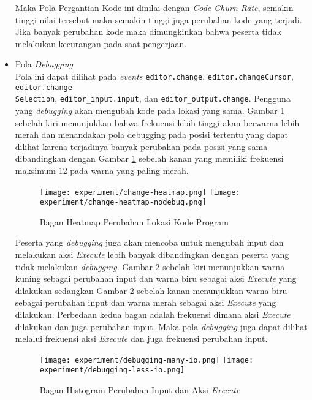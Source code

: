 \begin{itemize}
    Maka Pola Pergantian Kode ini dinilai dengan \textit{Code Churn Rate}, semakin tinggi nilai tersebut maka semakin tinggi juga perubahan kode yang terjadi. Jika banyak perubahan kode maka dimungkinkan bahwa peserta tidak melakukan kecurangan pada saat pengerjaan.

    \item Pola \textit{Debugging} \\
    Pola ini dapat dilihat pada \textit{events} \verb|editor.change|, \verb|editor.changeCursor|, \verb|editor.change|\\\verb|Selection|, \verb|editor_input.input|, dan \verb|editor_output.change|. Pengguna yang \textit{debugging} akan mengubah kode pada lokasi yang sama. Gambar \ref{fig:5:2:3:heatmapchange} sebelah kiri menunjukkan bahwa frekuensi lebih tinggi akan berwarna lebih merah dan menandakan pola debugging pada posisi tertentu yang dapat dilihat karena terjadinya banyak perubahan pada posisi yang sama dibandingkan dengan Gambar \ref{fig:5:2:3:heatmapchange} sebelah kanan yang memiliki frekuensi maksimum 12 pada warna yang paling merah.

    \begin{figure}[H]
        \centering
        \texttt{[image: experiment/change-heatmap.png]}
        \texttt{[image: experiment/change-heatmap-nodebug.png]}
        \caption{Bagan Heatmap Perubahan Lokasi Kode Program}
        \label{fig:5:2:3:heatmapchange}
    \end{figure}
    
    Peserta yang \textit{debugging} juga akan mencoba untuk mengubah input dan melakukan aksi \textit{Execute} lebih banyak dibandingkan dengan peserta yang tidak melakukan \textit{debugging}. Gambar \ref{fig:5:2:3:debug} sebelah kiri menunjukkan warna kuning sebagai perubahan input dan warna biru sebagai aksi \textit{Execute} yang dilakukan sedangkan Gambar \ref{fig:5:2:3:debug} sebelah kanan menunjukkan warna biru sebagai perubahan input dan warna merah sebagai aksi \textit{Execute} yang dilakukan. Perbedaan kedua bagan adalah frekuensi dimana aksi \textit{Execute} dilakukan dan juga perubahan input. Maka pola \textit{debugging} juga dapat dilihat melalui frekuensi aksi \textit{Execute} dan juga frekuensi perubahan input.

    \begin{figure}[H]
        \centering
        \texttt{[image: experiment/debugging-many-io.png]}
        \texttt{[image: experiment/debugging-less-io.png]}
        \caption{Bagan Histogram Perubahan Input dan Aksi \textit{Execute}}
        \label{fig:5:2:3:debug}
    \end{figure}


\end{itemize}
